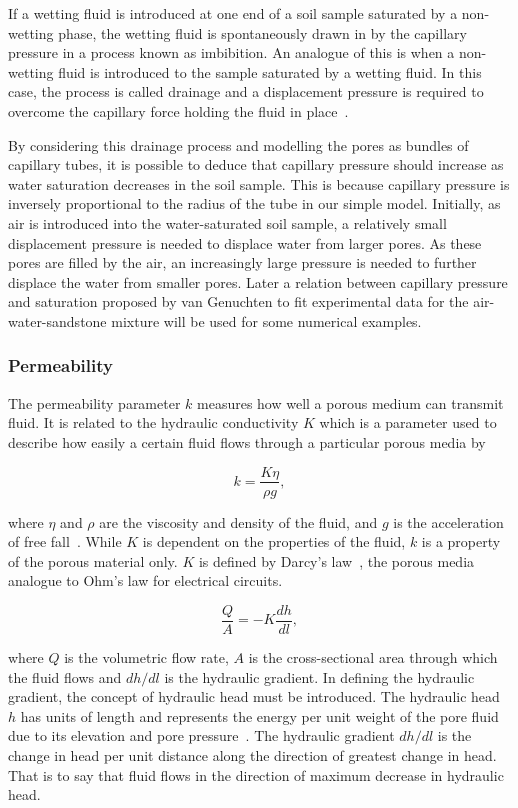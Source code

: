 \documentclass[twocolumn]{article}
\begin{document}
If a wetting fluid is introduced at one end of a soil sample saturated by a non-wetting phase, the wetting fluid is spontaneously drawn in by the capillary pressure in a process known as imbibition. An analogue of this is when a non-wetting fluid is introduced to the sample saturated by a wetting fluid. In this case, the process is called drainage and a displacement pressure is required to overcome the capillary force holding the fluid in place~\cite{glover_2014}.

By considering this drainage process and modelling the pores as bundles of capillary tubes, it is possible to deduce that capillary pressure should increase as water saturation decreases in the soil sample. This is because capillary pressure is inversely proportional to the radius of the tube in our simple model. Initially, as air is introduced into the water-saturated soil sample, a relatively small displacement pressure is needed to displace water from larger pores. As these pores are filled by the air, an increasingly large pressure is needed to further displace the water from smaller pores. Later a relation between capillary pressure and saturation proposed by van Genuchten to fit experimental data for the air-water-sandstone mixture will be used for some numerical examples.

\subsubsection{Permeability}
The permeability parameter $k$ measures how well a porous medium can transmit fluid. It is related to the hydraulic conductivity $K$ which is a parameter used to describe how easily a certain fluid flows through a particular porous media by

\begin{equation}
    k = \frac{K\eta}{\rho{g}},
\end{equation}

where $\eta$ and $\rho$ are the viscosity and density of the fluid, and $g$ is the acceleration of free fall~\cite{wang_2000}. While $K$ is dependent on the properties of the fluid, $k$ is a property of the porous material only. $K$ is defined by Darcy’s law~\cite{kirkham_2014}, the porous media analogue to Ohm’s law for electrical circuits.

\begin{equation}
    \frac{Q}{A} = -K\frac{dh}{dl},
\end{equation}

where $Q$ is the volumetric flow rate, $A$ is the cross-sectional area through which the fluid flows and $dh/dl$ is the hydraulic gradient. In defining the hydraulic gradient, the concept of hydraulic head must be introduced. The hydraulic head $h$ has units of length and represents the energy per unit weight of the pore fluid due to its elevation and pore pressure~\cite{hemond_fechner_2015}. The hydraulic gradient $dh/dl$ is the change in head per unit distance along the direction of greatest change in head. That is to say that fluid flows in the direction of maximum decrease in hydraulic head.
\end{document}
